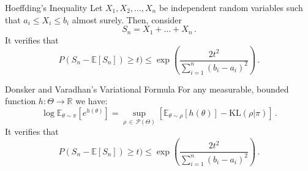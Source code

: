 \documentclass[aspectratio=159]{beamer}
\begin{document}
    \begin{frame}{Hoeffding's Inequality}
        Let \(X_1, X_2, \dots, X_n\) be independent random variables such that \(a_i \leq X_i \leq b_i\) almost surely. Then, consider
        \[
            S_n = X_1 + \dots + X_n\,.
        \]
        It verifies that
        \[
        P(S_n - \mathbb{E}[S_n]) \geq t) \leq \exp \left( \frac{2t^2}{\sum_{i = 1}^n (b_i - a_i)^2} \right)\,.
        \]
    \end{frame}

    \begin{frame}{Donsker and Varadhan’s Variational Formula}
        For any measurable, bounded function \(h : \Theta \to \mathbb{R}\) we have:
        \[
            \log \mathbb{E}_{\theta \sim \pi}[e^{h(\theta)}] = \sup_{\rho \, \in\, \mathcal{P}(\Theta)} \left[ \mathbb{E}_{\theta \sim \rho}[h(\theta)] - \text{KL}(\rho | \pi) \right]\,.
        \]
        It verifies that
        \[
        P(S_n - \mathbb{E}[S_n]) \geq t) \leq \exp \left( \frac{2t^2}{\sum_{i = 1}^n (b_i - a_i)^2} \right)\,.
        \]
    \end{frame}
    
\end{document}
